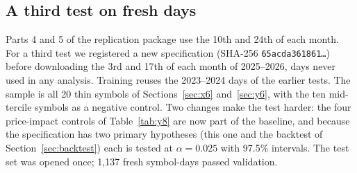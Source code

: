 \documentclass[12pt]{article}
\theoremstyle{definition}
\theoremstyle{remark}
\begin{document}
\subsection{A third test on fresh days}\label{sec:z6}
Parts 4 and 5 of the replication package use the 10th and 24th of each month. For a third test we registered a new specification (SHA-256 \texttt{65acda361861\ldots}) before downloading the 3rd and 17th of each month of 2025--2026, days never used in any analysis. Training reuses the 2023--2024 days of the earlier tests. The sample is all 20 thin symbols of Sections~\ref{sec:x6} and~\ref{sec:y6}, with the ten mid-tercile symbols as a negative control. Two changes make the test harder: the four price-impact controls of Table~\ref{tab:y8} are now part of the baseline, and because the specification has two primary hypotheses (this one and the backtest of Section~\ref{sec:backtest}) each is tested at $\alpha=0.025$ with 97.5\% intervals. The test set was opened once; 1{,}137 fresh symbol-days passed validation.
\end{document}
